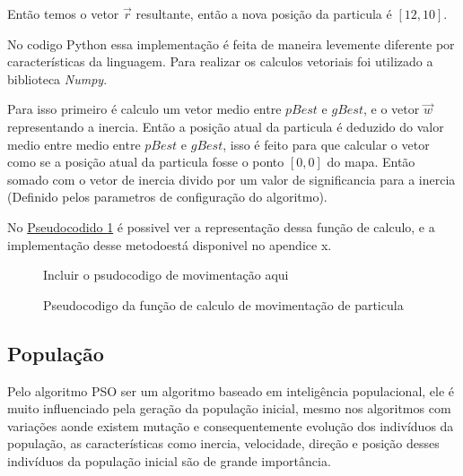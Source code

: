                 \noindent Então temos o vetor $\vec r$ resultante, então a nova posição da particula é $[12,10]$.
                
                No codigo Python essa implementação é feita de maneira levemente diferente por características da linguagem. Para realizar os calculos vetoriais foi utilizado a biblioteca \textit{Numpy}. \newline
                
                Para isso primeiro é calculo um vetor medio entre $pBest$ e $gBest$, e o vetor $\vec w$ representando a inercia. \newline
                Então a posição atual da particula é deduzido do valor medio entre medio entre $pBest$ e $gBest$, isso é feito para que calcular o vetor como se a posição atual da particula fosse o ponto $[0,0]$ do mapa.\newline
                Então somado com o vetor de inercia divido por um valor de significancia para a inercia (Definido pelos parametros de configuração do algoritmo).\newline

                No \hyperref[cod:new-posicao]{Pseudocodido \ref{cod:new-posicao}} é possivel ver a representação dessa função de calculo, e a implementação desse metodoestá disponivel no apendice x.
                
                \begin{figure}[h]
                    \centering
                    \small{Incluir o psudocodigo de movimentação aqui}
                    \caption{Pseudocodigo da função de calculo de movimentação de particula}
                    \label{cod:new-posicao}
                \end{figure}






    \subsection{População}
        Pelo algoritmo PSO ser um algoritmo baseado em inteligência populacional, ele é muito influenciado pela geração da população inicial, mesmo nos algoritmos com variações aonde existem mutação e consequentemente evolução dos indivíduos da população, as características como inercia, velocidade, direção e posição desses indivíduos da população inicial são de grande importância.\newline

